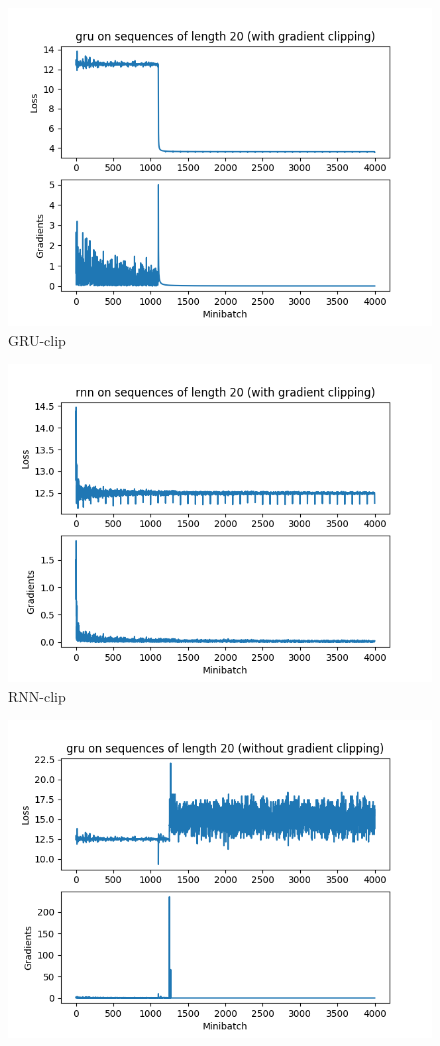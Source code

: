 \documentclass[10pt, a4paper]{ctexart}
\begin{document}
\begin{enumerate}
{\begin{figure}[H]
            \includegraphics[width=0.7\linewidth]{../q3-clip-gru.png}
            \caption{GRU-clip}
        \end{figure}
        \begin{figure}[H]
            \centering
            \includegraphics[width=0.7\linewidth]{../q3-clip-rnn.png}
            \caption{RNN-clip}
        \end{figure}
        \begin{figure}[H]
            \centering
            \includegraphics[width=0.7\linewidth]{../q3-noclip-gru.png}

\end{figure}}
\end{enumerate}
\end{document}
